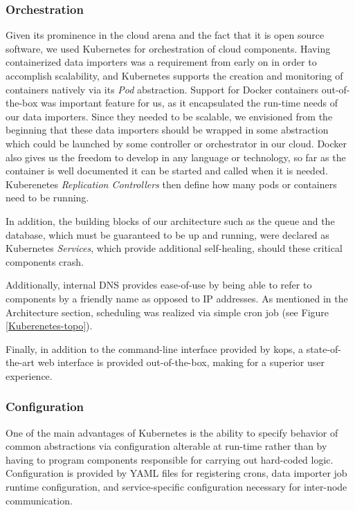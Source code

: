 \subsubsection{Orchestration}\label{orchestration-1}

Given its prominence in the cloud arena and the fact that it is open
source software, we used Kubernetes for orchestration of cloud
components. Having containerized data importers was a requirement from
early on in order to accomplish scalability, and Kubernetes supports the
creation and monitoring of containers natively via its \emph{Pod}
abstraction. Support for Docker containers out-of-the-box was important 
feature for us, as it encapsulated the run-time needs of
our data importers. Since they needed to be scalable, we envisioned from
the beginning that these data importers should be wrapped in some
abstraction which could be launched by some controller or 
orchestrator in our cloud. Docker also gives us the freedom to develop
in any language or technology, so far as the container is well documented
it can be started and called when it is needed. Kuberenetes \emph{Replication Controllers}
then define how many pods or containers need to be running.

In addition, the building blocks of our architecture such
as the queue and the database, which must be guaranteed to be up and
running, were declared as Kubernetes \emph{Services}, which provide
additional self-healing, should these critical components crash.

Additionally, internal DNS provides ease-of-use by being able to refer
to components by a friendly name as opposed to IP addresses. As
mentioned in the Architecture section, scheduling was realized via
simple cron job (see Figure \ref{Kuberenetes-topo}).

Finally, in addition to the command-line interface provided by kops, a
state-of-the-art web interface is provided out-of-the-box, making for a
superior user experience.

\subsubsection{Configuration}\label{configuration}

One of the main advantages of Kubernetes is the ability to specify
behavior of common abstractions via configuration alterable at run-time
rather than by having to program components responsible for carrying out
hard-coded logic. Configuration is provided by YAML files for
registering crons, data importer job runtime configuration, and
service-specific configuration necessary for inter-node communication.



